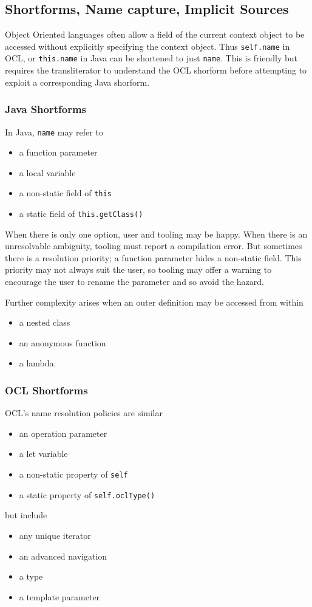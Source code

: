 \documentclass[sigconf]{acmart}
\begin{document}
\subsection{Shortforms, Name capture, Implicit Sources}

Object Oriented languages often allow a field of the current context object to be accessed without explicitly specifying the context object. Thus \texttt{self.name} in OCL, or \texttt{this.name} in Java can be shortened to just \texttt{name}. This is friendly but requires the transliterator to understand the OCL shorform before attempting to exploit a corresponding Java shorform.

\subsubsection{Java Shortforms}

In Java, \texttt{name} may refer to
\begin{itemize}
	\item a function parameter
	\item a local variable
	\item a non-static field of \texttt{this}
	\item a static field of \texttt{this.getClass()}
\end{itemize}
When there is only one option, user and tooling may be happy. When there is an unresolvable ambiguity, tooling must report a compilation error. But sometimes there is a resolution priority; a function parameter hides a non-static field. This priority may not always suit the user, so tooling may offer a warning to encourage the user to rename the parameter and so avoid the hazard.

Further complexity arises when an outer definition may be accessed from within
\begin{itemize}
	\item a nested class
	\item an anonymous function
	\item a lambda.
\end{itemize}

\subsubsection{OCL Shortforms}

OCL's name resolution policies are similar

\begin{itemize}
	\item an operation parameter
	\item a let variable
	\item a non-static property of \texttt{self}
	\item a static property of \texttt{self.oclType()}
\end{itemize}
but include 
\begin{itemize}
	\item any unique iterator
	\item an advanced navigation
	\item a type
	\item a template parameter
\end{itemize}
\end{document}
